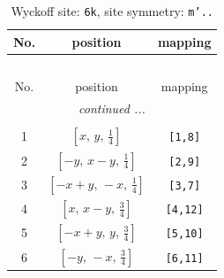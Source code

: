 \documentclass[fleqn,8pt]{jsarticle}
\begin{document}
\renewcommand{\arraystretch}{1.2}
\begin{longtable}{ccc}
\caption{Wyckoff site: {\tt 6k}, site symmetry: {\tt m'..}}
 \\
 \hline \hline
No. & position & mapping \\ \hline \endfirsthead

\multicolumn{2}{l}{\tablename\ \thetable{}} \\
 \hline \hline
No. & position & mapping \\ \hline \endhead

 \hline \hline
\multicolumn{2}{r}{\footnotesize\it continued ...} \\ \endfoot

 \hline \hline
\multicolumn{2}{r}{} \\ \endlastfoot

1 & $\left[ x,\, y,\, \frac{1}{4} \right]$ & {\tt [1,8]} \\ \hline
2 & $\left[ - y,\, x - y,\, \frac{1}{4} \right]$ & {\tt [2,9]} \\ \hline
3 & $\left[ - x + y,\, - x,\, \frac{1}{4} \right]$ & {\tt [3,7]} \\ \hline
4 & $\left[ x,\, x - y,\, \frac{3}{4} \right]$ & {\tt [4,12]} \\ \hline
5 & $\left[ - x + y,\, y,\, \frac{3}{4} \right]$ & {\tt [5,10]} \\ \hline
6 & $\left[ - y,\, - x,\, \frac{3}{4} \right]$ & {\tt [6,11]} \\
\end{longtable}
\renewcommand{\arraystretch}{1.2}
\end{document}
